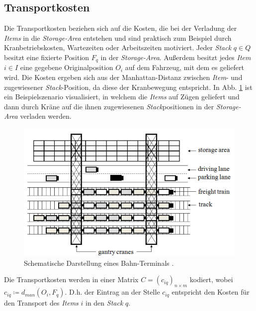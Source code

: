 \subsection{Transportkosten}
\label{sec:transport_costs}
Die Transportkosten beziehen sich auf die Kosten, die bei der Verladung der \textit{Items} in die \textit{Storage-Area} entstehen
und sind praktisch zum Beispiel durch Kranbetriebskosten, Wartezeiten oder Arbeitszeiten motiviert.\newline
Jeder \textit{Stack} $q \in Q$ besitzt eine fixierte Position $F_q$ in der \textit{Storage-Area}.
Außerdem besitzt jedes \textit{Item} $i \in I$ eine gegebene Originalposition $O_i$ auf dem Fahrzeug, mit dem es geliefert wird.
Die Kosten ergeben sich aus der Manhattan-Distanz zwischen \textit{Item}- und zugewiesener \textit{Stack}-Position, da diese der Kranbewegung entspricht. In Abb. \ref{fig:costs} ist ein Beispielszenario visualisiert, in welchem die \textit{Items} auf Zügen geliefert und dann durch Kräne auf die ihnen zugewiesenen \textit{Stack}positionen in der \textit{Storage-Area} verladen werden.
\begin{figure}[H]
\includegraphics[width=\textwidth]{img/costs.png}
\caption{Schematische Darstellung eines Bahn-Terminals \cite{Briskorn2018}.}
\label{fig:costs}
\end{figure}
Die Transportkosten werden in einer Matrix $C = (c_{iq})_{n \times m}$ kodiert, \newline wobei $c_{iq} \coloneqq d_{man}(O_i, F_q)$.
D.h. der Eintrag an der Stelle $c_{iq}$ entspricht den Kosten für den Transport des \textit{Items} $i$ in den \textit{Stack} $q$.

\pagebreak


